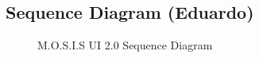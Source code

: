 \subsection{Sequence Diagram (Eduardo)}
\begin{figure}[ht!]
	\caption{M.O.S.I.S UI 2.0 Sequence Diagram}
\end{figure}